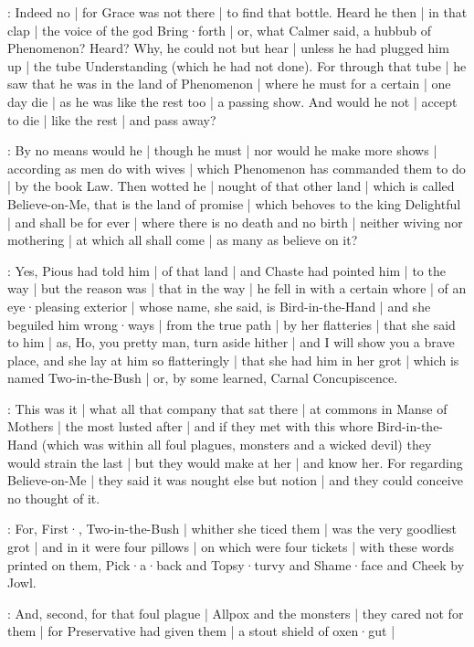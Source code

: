 :
Indeed no |
for Grace was not there |
to find that bottle.
Heard he then |
in that clap |
the voice of the god Bring·forth |
or,
what Calmer said,
a hubbub of Phenomenon?
Heard?
Why,
he could not but hear |
unless he had plugged him up |
the tube Understanding
(which he had not done).
For through that tube |
he saw that he was in the land of Phenomenon |
where he must for a certain |
one day die |
as he was like the rest too |
a passing show.
And would he not |
accept to die |
like the rest |
and pass away?

:
By no means would he |
though he must |
nor would he make more shows |
according as men do with wives |
which Phenomenon has commanded them to do |
by the book Law.
Then wotted he |
nought of that other land |
which is called Believe-on-Me,
that is the land of promise |
which behoves to the king Delightful |
and shall be for ever |
where there is no death and no birth |
neither wiving nor mothering |
at which all shall come |
as many as believe on it?

:
Yes,
Pious had told him |
of that land |
and Chaste had pointed him |
to the way |
but the reason was |
that in the way |
he fell in with a certain whore |
of an eye·pleasing exterior |
whose name,
she said,
is Bird-in-the-Hand |
and she beguiled him wrong·ways |
from the true path |
by her flatteries |
that she said to him |
as,
Ho,
you pretty man,
turn aside hither |
and I will show you a brave place,
and she lay at him so flatteringly |
that she had him in her grot |
which is named Two-in-the-Bush |
or,
by some learned,
Carnal Concupiscence.


:
This was it |
what all that company that sat there |
at commons in Manse of Mothers |
the most lusted after |
and if they met with this whore Bird-in-the-Hand
(which was within all foul plagues,
monsters and a wicked devil)
they would strain the last |
but they would make at her |
and know her.
For regarding Believe-on-Me |
they said it was nought else but notion |
and they could conceive no thought of it.

:
For,
First·,
Two-in-the-Bush |
whither she ticed them |
was the very goodliest grot |
and in it were four pillows |
on which were four tickets |
with these words printed on them,
Pick·a·back and Topsy·turvy and Shame·face and Cheek by Jowl.

:
And,
second,
for that foul plague |
Allpox and the monsters |
they cared not for them |
for Preservative had given them |
a stout shield of oxen·gut |

